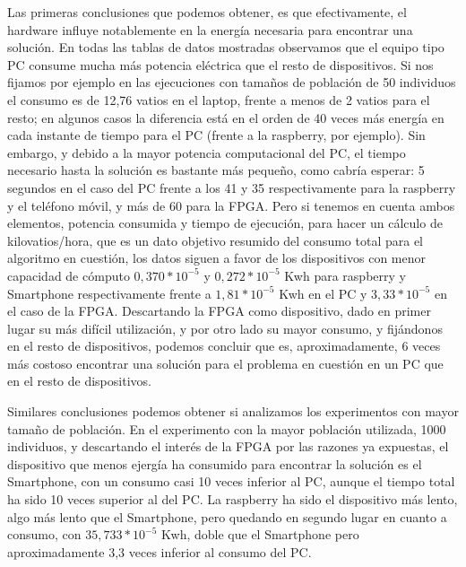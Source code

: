 
Las primeras conclusiones que podemos obtener, es que efectivamente, el hardware influye notablemente en la energía necesaria para encontrar una solución.  En todas las 
tablas de datos mostradas observamos que el equipo tipo PC consume mucha más potencia eléctrica que el resto de dispositivos.  Si nos fijamos por ejemplo en las ejecuciones con tamaños de población de 50 individuos el consumo es de 12,76 vatios en el laptop, frente a menos de 2 vatios para el resto;  en algunos casos la diferencia está en el orden de 40 veces más energía en cada instante de tiempo para el PC (frente a la raspberry, por ejemplo).  Sin embargo, y debido a la mayor potencia computacional del PC, el tiempo necesario hasta la solución es bastante más pequeño, como cabría esperar:  5 segundos en el caso del PC frente a los 41 y 35 respectivamente para la raspberry y el teléfono móvil, y más de 60 para la FPGA.  Pero si tenemos en cuenta ambos elementos, potencia consumida y tiempo de ejecución, para hacer un cálculo de kilovatios/hora, que es un dato objetivo resumido del consumo total para el algoritmo en cuestión, 
los datos siguen a favor de los dispositivos con menor capacidad de cómputo $0,370*10^{-5}$ y $0,272*10^{-5}$ Kwh para raspberry y Smartphone respectivamente frente a $1,81*10^{-5}$ Kwh en el PC y $3,33*10^{-5}$ en el caso de la FPGA.  Descartando la FPGA como dispositivo, dado en primer lugar 
su más difícil utilización, y por otro lado su mayor consumo, y fijándonos en el resto de dispositivos, podemos concluir que es, aproximadamente, 6 veces más costoso encontrar una solución para el problema en cuestión en un PC que en el resto de dispositivos.  

Similares conclusiones podemos obtener si analizamos los experimentos con mayor tamaño de población.  En el experimento con la mayor población utilizada, 1000 individuos, y descartando el interés de la FPGA por las razones ya expuestas, el
dispositivo que menos ejergía ha consumido para encontrar la solución es el Smartphone, con un consumo casi 10 veces inferior al PC, aunque el tiempo 
total ha sido 10 veces superior al del PC.  La raspberry ha sido el dispositivo más lento, algo más lento que el Smartphone, pero quedando en segundo lugar en 
cuanto a consumo, con $35,733*10^{-5}$ Kwh, doble que el Smartphone pero aproximadamente 3,3 veces inferior al consumo del PC.

